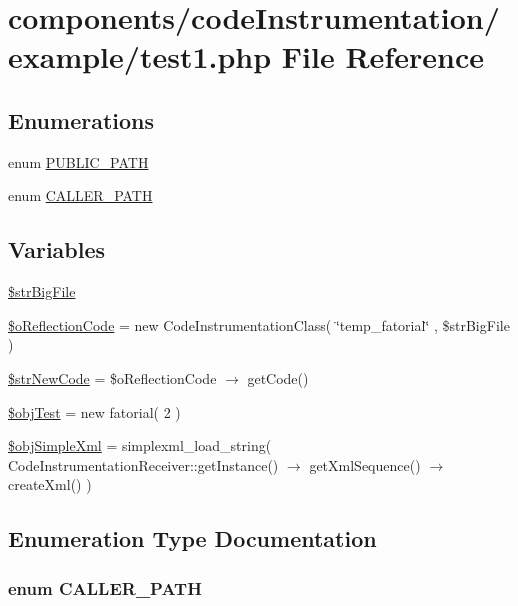 \hypertarget{code_instrumentation_2example_2test1_8php}{
\section{components/codeInstrumentation/example/test1.php File Reference}
\label{code_instrumentation_2example_2test1_8php}
}
\subsection*{Enumerations}
\begin{CompactItemize}
\item 
enum \hyperlink{code_instrumentation_2example_2test1_8php_b72f88470e4eee5518bfc7c908101d80}{PUBLIC\_\-PATH} 
\item 
enum \hyperlink{code_instrumentation_2example_2test1_8php_58763391df8832eea0c173fe59e5c977}{CALLER\_\-PATH} 
\end{CompactItemize}
\subsection*{Variables}
\begin{CompactItemize}
\item 
\hyperlink{code_instrumentation_2example_2test1_8php_78bb668948bf961e4e27227e71de5850}{\$strBigFile}
\item 
\hyperlink{code_instrumentation_2example_2test1_8php_dff853bfc3335950f89bfb9e1a779c7e}{\$oReflectionCode} = new CodeInstrumentationClass( \char`\"{}temp\_\-fatorial\char`\"{} , \$strBigFile )
\item 
\hyperlink{code_instrumentation_2example_2test1_8php_882f0b62de6f379d0e0cf88ef6658601}{\$strNewCode} = \$oReflectionCode $\rightarrow$ getCode()
\item 
\hyperlink{code_instrumentation_2example_2test1_8php_e72f9ac2779bbc5e49a4a9df50c17c73}{\$objTest} = new fatorial( 2 )
\item 
\hyperlink{code_instrumentation_2example_2test1_8php_da23b058075209c6506f7b0b1bb0d5bf}{\$objSimpleXml} = simplexml\_\-load\_\-string( CodeInstrumentationReceiver::getInstance() $\rightarrow$ getXmlSequence() $\rightarrow$ createXml() )
\end{CompactItemize}


\subsection{Enumeration Type Documentation}
\hypertarget{code_instrumentation_2example_2test1_8php_58763391df8832eea0c173fe59e5c977}{
\subsubsection[{CALLER\_\-PATH}]{\setlength{\rightskip}{0pt plus 5cm}enum {\bf CALLER\_\-PATH}}}
\label{code_instrumentation_2example_2test1_8php_58763391df8832eea0c173fe59e5c977}


